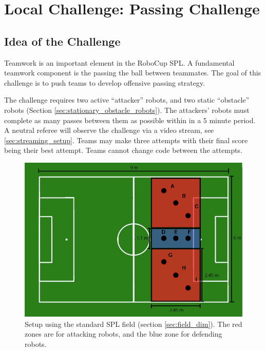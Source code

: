 \section{Local Challenge: Passing Challenge}
\label{sec:PassingChallenge}

\subsection{Idea of the Challenge}
Teamwork is an important element in the RoboCup SPL. A fundamental teamwork component is the passing the ball between teammates. The goal of this challenge is to push teams to develop offensive passing strategy. 

The challenge requires two active ``attacker'' robots, and two static ``obstacle'' robots (\cf Section \ref{sec:stationary_obstacle_robots}). The attackers' robots must complete as many passes between them as possible within in a 5 minute period.
A neutral referee will observe the challenge via a video stream, see \ref{sec:streaming_setup}.
Teams may make three attempts with their final score being their best attempt. Teams cannot change code between the attempts.
\begin{figure}[ht]
\includegraphics[width=0.95\linewidth]{figs/ch_2_full.jpg}
\caption{Setup using the standard SPL field (\cf section \ref{sec:field_dim}). The red zones are for attacking robots, and the blue zone for defending robots. }
\label{ch2:zone96}
\centering
\end{figure}


